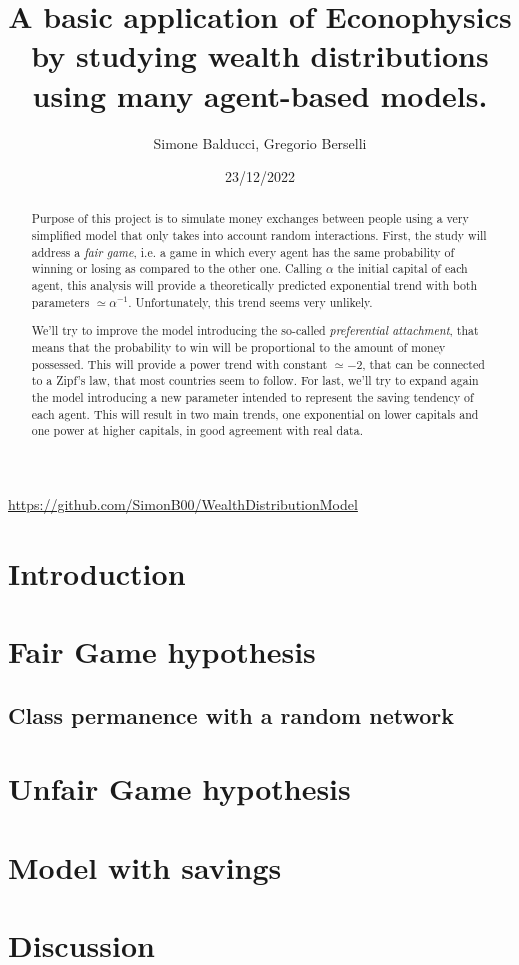 \documentclass[12pt,a4paper]{article}
\title{A basic application of Econophysics by studying wealth distributions using many agent-based models.}
\author{Simone Balducci, Gregorio Berselli}
\date{23/12/2022}
\begin{document}
\maketitle
\begin{center}
	\url{https://github.com/SimonB00/WealthDistributionModel}
\end{center}

\begin{abstract}
    Purpose of this project is to simulate money exchanges between people using a very simplified model that only takes into account random interactions.
    First, the study will address a \emph{fair game}, i.e. a game in which every agent has the same probability of winning or losing as compared to the other one.
    Calling $\alpha$ the initial capital of each agent, this analysis will provide a theoretically predicted exponential trend with both parameters $\simeq \alpha^{-1}$. 
    Unfortunately, this trend seems very unlikely.

    We'll try to improve the model introducing the so-called \emph{preferential attachment}, that means that the probability to win will be proportional to the amount of money possessed.
    This will provide a power trend with constant $\simeq -2$, that can be connected to a Zipf's law, that most countries seem to follow.
    For last, we'll try to expand again the model introducing a new parameter intended to represent the saving tendency of each agent.
    This will result in two main trends, one exponential on lower capitals and one power at higher capitals, in good agreement with real data. 
\end{abstract}

\newpage
\thispagestyle{empty}
\addtocounter{page}{-2}
\mbox{}

\tableofcontents
\pagebreak

\section*{Introduction}

\pagebreak

\section{Fair Game hypothesis}


\subsection{Class permanence with a random network}

\pagebreak

\section{Unfair Game hypothesis}

\pagebreak

\section{Model with savings}

\pagebreak
\clearpage

\section{Discussion}


\newpage
\thispagestyle{empty}
\mbox{}

\printbibliography
\end{document}
